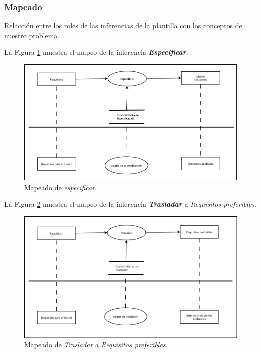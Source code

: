 \subsubsection{Mapeado}

Relacción entre los roles de las inferencias de la plantilla con los conceptos de nuestro problema.

La Figura \ref{fig:Especificar} muestra el mapeo de la inferencia \textbf{\textit{Especificar}}.

\begin{figure}[H]
  \centering
  \includegraphics[scale=0.35]{imaxes/Especificar.png}
  \caption{\label{fig:Especificar}Mapeado de \textit{especificar}.}
\end{figure}

La Figura \ref{fig:TrasladarPreferibles} muestra el mapeo de la inferencia \textbf{\textit{Trasladar}} a \textit{Requisitos preferibles}.

\begin{figure}[H]
  \centering
  \includegraphics[scale=0.35]{imaxes/TrasladarPreferibles.png}
  \caption{\label{fig:TrasladarPreferibles}Mapeado de \textit{Trasladar} a \textit{Requisitos preferibles}.}
\end{figure}

